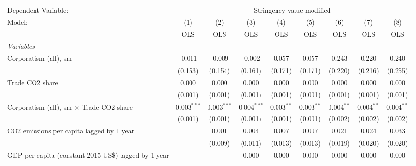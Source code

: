 
\begingroup
\centering
\begin{tabular}{lcccccccc}
   \toprule
   Dependent Variable: & \multicolumn{8}{c}{Stringency value modified}\\
   Model:                                                    & (1)           & (2)           & (3)           & (4)          & (5)          & (6)          & (7)           & (8)\\  
                                                             &  OLS          & OLS           & OLS           & OLS          & OLS          & OLS          & OLS           & OLS\\  
   \midrule
   \emph{Variables}\\
   Corporatism (all), sm                                     & -0.011        & -0.009        & -0.002        & 0.057        & 0.057        & 0.243        & 0.220         & 0.240\\   
                                                             & (0.153)       & (0.154)       & (0.161)       & (0.171)      & (0.171)      & (0.220)      & (0.216)       & (0.255)\\   
   Trade CO2 share                                           & 0.000         & 0.000         & 0.000         & 0.000        & 0.000        & 0.000        & 0.000         & 0.000\\   
                                                             & (0.001)       & (0.001)       & (0.001)       & (0.001)      & (0.001)      & (0.001)      & (0.001)       & (0.001)\\   
   Corporatism (all), sm $\times$ Trade CO2 share            & 0.003$^{***}$ & 0.003$^{***}$ & 0.004$^{***}$ & 0.003$^{**}$ & 0.003$^{**}$ & 0.004$^{**}$ & 0.004$^{**}$  & 0.004$^{**}$\\   
                                                             & (0.001)       & (0.001)       & (0.001)       & (0.001)      & (0.001)      & (0.002)      & (0.002)       & (0.002)\\   
   CO2 emissions per capita lagged by 1 year                 &               & 0.001         & 0.004         & 0.007        & 0.007        & 0.021        & 0.024         & 0.033\\   
                                                             &               & (0.009)       & (0.011)       & (0.013)      & (0.013)      & (0.019)      & (0.020)       & (0.020)\\   
   GDP per capita (constant 2015 US\$) lagged by 1 year      &               &               & 0.000         & 0.000        & 0.000        & 0.000        & 0.000         & 0.000\\   

\end{tabular}
